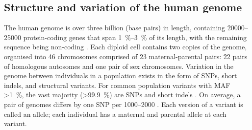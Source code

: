 \subsection{Structure and variation of the human genome}

The human genome is over three billion \si{\bp} (base pairs) in length, 
containing \numrange{20000}{25000} protein-coding genes that span \SIrange{1}{3}{\percent} of its length, with the remaining sequence being non-coding \autocite{theencodeprojectconsortium2012IntegratedEncyclopediaDNA,1000genomesprojectconsortium2015GlobalReferenceHuman}.
Each diploid cell contains two copies of the genome, organised into 46 chromosomes comprised of 23 maternal-parental pairs: 22 pairs of homologous autosomes and one pair of sex chromosomes.
Variation in the genome between individuals in a population exists in the form of \glspl{SNP}, short indels, and structural variants.
For common population variants with \gls{MAF} \SI{>1}{\percent},
the vast majority (\SI[round-precision=1]{>99.9}{\percent}) are \glspl{SNP} and short indels \autocite{1000genomesprojectconsortium2015GlobalReferenceHuman}.
On average, a pair of genomes differs by one \gls{SNP} per \SIrange{1000}{2000}{\bp} \autocite{theinternationalsnpmapworkinggroup2001MapHumanGenome}.
Each version of a variant is called an allele; each individual has a maternal and parental allele at each variant.

